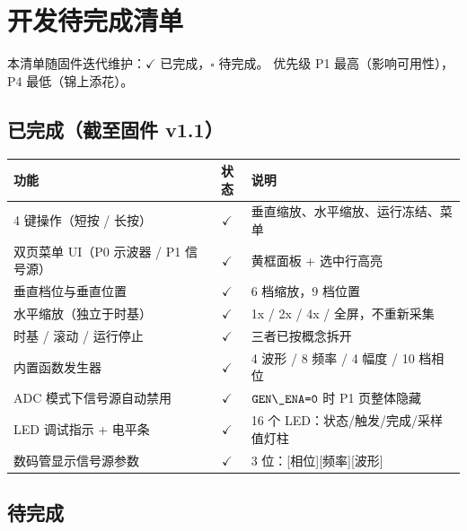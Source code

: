 \documentclass[UTF8,a4paper,11pt]{ctexart}
\begin{document}
\section{开发待完成清单}
\label{sec:todo}

本清单随固件迭代维护：$\checkmark$ 已完成，$\square$ 待完成。
优先级 P1 最高（影响可用性），P4 最低（锦上添花）。

\subsection*{已完成（截至固件 v1.1）}

\begin{center}
\small
\begin{tabular}{p{6.2cm}cp{6.0cm}}
\toprule
功能 & 状态 & 说明\\
\midrule
4 键操作（短按 / 长按） & $\checkmark$ & 垂直缩放、水平缩放、运行冻结、菜单\\
双页菜单 UI（P0 示波器 / P1 信号源） & $\checkmark$ & 黄框面板 + 选中行高亮\\
垂直档位与垂直位置 & $\checkmark$ & 6 档缩放，9 档位置\\
水平缩放（独立于时基） & $\checkmark$ & 1x / 2x / 4x / 全屏，不重新采集\\
时基 / 滚动 / 运行停止 & $\checkmark$ & 三者已按概念拆开\\
内置函数发生器 & $\checkmark$ & 4 波形 / 8 频率 / 4 幅度 / 10 档相位\\
ADC 模式下信号源自动禁用 & $\checkmark$ & \(\sig{GEN\_ENA=0}\) 时 P1 页整体隐藏\\
LED 调试指示 + 电平条 & $\checkmark$ & 16 个 LED：状态/触发/完成/采样值灯柱\\
数码管显示信号源参数 & $\checkmark$ & 3 位：[相位][频率][波形]\\
\bottomrule
\end{tabular}
\end{center}

\subsection*{待完成}
\end{document}
